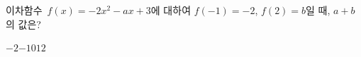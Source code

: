 이차함수~$f(x)=-2x^2-ax+3$에 대하여 $f(-1)=-2$, $f(2)=b$일 때, $a+b$의 값은? 
\begin{choices32}{$-2$}{$-1$}{$0$}{$1$}{$2$}\end{choices32}
